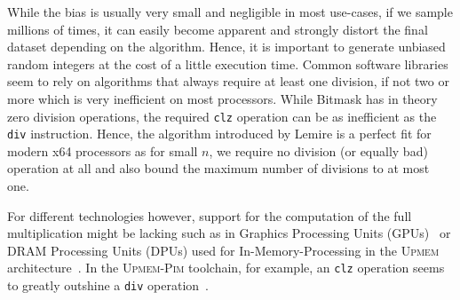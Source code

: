 \documentclass[a4paper, UKenglish, cleveref, autoref, thm-restate]{lipics-v2021}
\begin{document}
While the bias is usually very small and negligible in most use-cases, if we sample millions of times, it can easily become apparent and strongly distort the final dataset depending on the algorithm.
Hence, it is important to generate unbiased random integers at the cost of a little execution time.
Common software libraries seem to rely on algorithms that always require at least one division, if not two or more which is very inefficient on most processors.
While Bitmask has in theory zero division operations, the required \texttt{clz} operation can be as inefficient as the \texttt{div} instruction.
Hence, the algorithm introduced by Lemire is a perfect fit for modern x64 processors as for small $n$, we require no division (or equally bad) operation at all and also bound the maximum number of divisions to at most one.

For different technologies however, support for the computation of the full multiplication might be lacking such as in Graphics Processing Units (GPUs)~\cite{GPU} or DRAM Processing Units (DPUs) used for In-Memory-Processing in the \textsc{Upmem} architecture~\cite{Upmem}.
In the \textsc{Upmem-Pim} toolchain, for example, an \texttt{clz} operation seems to greatly outshine a \texttt{div} operation~\cite{UpmemRng}.






\end{document}
